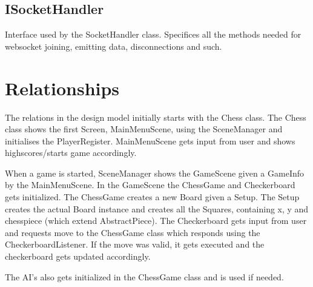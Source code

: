 \documentclass{article}
\begin{document}
\subsection {ISocketHandler}
Interface used by the SocketHandler class. Specifices all the methods needed for websocket joining, emitting data, disconnections and such.

\section*{Relationships}
The relations in the design model initially starts with the Chess class. The Chess class shows the first Screen, MainMenuScene, using the SceneManager and initialises the PlayerRegister. MainMenuScene gets input from user and shows highscores/starts game accordingly.

When a game is started, SceneManager shows the GameScene given a GameInfo by the MainMenuScene. In the GameScene the ChessGame and Checkerboard gets initialized. The ChessGame creates a new Board given a Setup. The Setup creates the actual Board instance and creates all the Squares, containing x, y and chesspiece (which extend AbstractPiece). The Checkerboard gets input from user and requests move to the ChessGame class which responds using the CheckerboardListener. If the move was valid, it gets executed and the checkerboard gets updated accordingly.

The AI’s also gets initialized in the ChessGame class and is used if needed.
\end{document}
